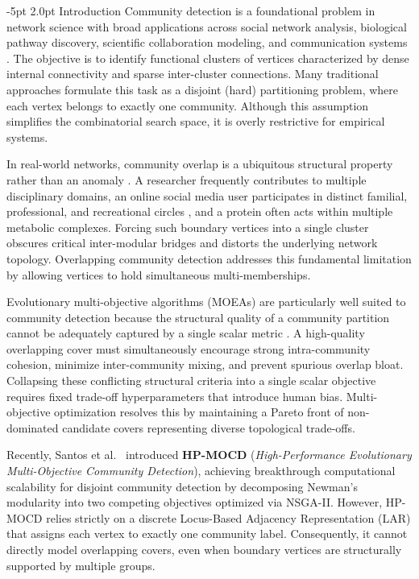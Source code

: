 \documentclass{svproc}
\makeatletter
\renewcommand\section{\@startsection{section}{1}{\z@}%
  {-5pt \@plus -1pt \@minus -0.5pt}%
  {2.0pt \@plus 0.5pt}%
  {\normalfont\large\bfseries\boldmath}}
\makeatother
\begin{document}
\section{Introduction}\label{sec:intro}
Community detection is a foundational problem in network science with broad applications across social network analysis, biological pathway discovery, scientific collaboration modeling, and communication systems \cite{fortunato2010,newman2006,girvan2002}. The objective is to identify functional clusters of vertices characterized by dense internal connectivity and sparse inter-cluster connections. Many traditional approaches formulate this task as a disjoint (hard) partitioning problem, where each vertex belongs to exactly one community. Although this assumption simplifies the combinatorial search space, it is overly restrictive for empirical systems.

In real-world networks, community overlap is a ubiquitous structural property rather than an anomaly \cite{palla2005,xie2013}. A researcher frequently contributes to multiple disciplinary domains, an online social media user participates in distinct familial, professional, and recreational circles \cite{leskovec2012}, and a protein often acts within multiple metabolic complexes. Forcing such boundary vertices into a single cluster obscures critical inter-modular bridges and distorts the underlying network topology. Overlapping community detection addresses this fundamental limitation by allowing vertices to hold simultaneous multi-memberships.

Evolutionary multi-objective algorithms (MOEAs) are particularly well suited to community detection because the structural quality of a community partition cannot be adequately captured by a single scalar metric \cite{pizzuti2012,deb2002}. A high-quality overlapping cover must simultaneously encourage strong intra-community cohesion, minimize inter-community mixing, and prevent spurious overlap bloat. Collapsing these conflicting structural criteria into a single scalar objective requires fixed trade-off hyperparameters that introduce human bias. Multi-objective optimization resolves this by maintaining a Pareto front of non-dominated candidate covers representing diverse topological trade-offs.

Recently, Santos et al.~\cite{santos2025} introduced \textbf{HP-MOCD} (\textit{High-Performance Evolutionary Multi-Objective Community Detection}), achieving breakthrough computational scalability for disjoint community detection by decomposing Newman's modularity into two competing objectives optimized via NSGA-II. However, HP-MOCD relies strictly on a discrete Locus-Based Adjacency Representation (LAR) that assigns each vertex to exactly one community label. Consequently, it cannot directly model overlapping covers, even when boundary vertices are structurally supported by multiple groups.
\end{document}
